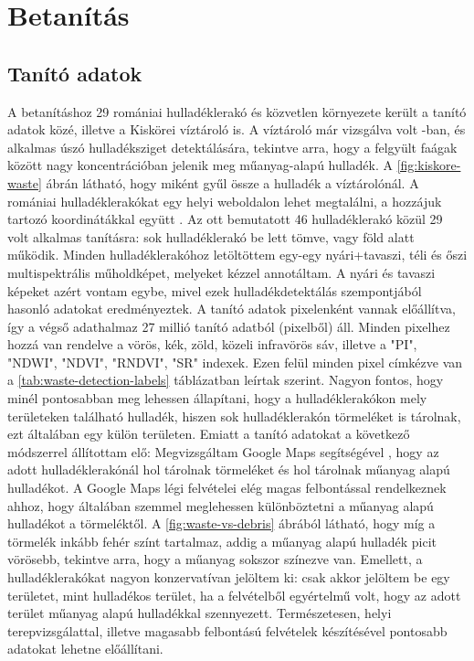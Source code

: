 \chapter{Betanítás}
\label{ch:training}

\section{Tanító adatok}

A betanításhoz 29 romániai hulladéklerakó és közvetlen környezete került a tanító adatok közé, illetve a Kiskörei víztároló is. A víztároló már vizsgálva volt \cite{magyar2023}-ban, és alkalmas úszó hulladéksziget detektálására, tekintve arra, hogy a felgyült faágak között nagy koncentrációban jelenik meg műanyag-alapú hulladék. A \ref{fig:kiskore-waste} ábrán látható, hogy miként gyűl össze a hulladék a víztárolónál. A romániai hulladéklerakókat egy helyi weboldalon lehet megtalálni, a hozzájuk tartozó koordinátákkal együtt \cite{wasteromania2019}. Az ott bemutatott 46 hulladéklerakó közül 29 volt alkalmas tanításra: sok hulladéklerakó be lett tömve, vagy föld alatt működik. Minden hulladéklerakóhoz letöltöttem egy-egy nyári+tavaszi, téli és őszi multispektrális műholdképet, melyeket kézzel annotáltam. A nyári és tavaszi képeket azért vontam egybe, mivel ezek hulladékdetektálás szempontjából hasonló adatokat eredményeztek. A tanító adatok pixelenként vannak előállítva, így a végső adathalmaz 27 millió tanító adatból (pixelből) áll. Minden pixelhez hozzá van rendelve a vörös, kék, zöld, közeli infravörös sáv, illetve a "PI", "NDWI", "NDVI", "RNDVI", "SR" indexek. Ezen felül minden pixel címkézve van a \ref{tab:waste-detection-labels} táblázatban leírtak szerint. Nagyon fontos, hogy minél pontosabban meg lehessen állapítani, hogy a hulladéklerakókon mely területeken található hulladék, hiszen sok hulladéklerakón törmeléket is tárolnak, ezt általában egy külön területen. Emiatt a tanító adatokat a következő módszerrel állítottam elő: Megvizsgáltam Google Maps segítségével \cite{googlemaps2024}, hogy az adott hulladéklerakónál hol tárolnak törmeléket és hol tárolnak műanyag alapú hulladékot. A Google Maps légi felvételei elég magas felbontással rendelkeznek ahhoz, hogy általában szemmel meglehessen különböztetni a műanyag alapú hulladékot a törmeléktől. A \ref{fig:waste-vs-debris} ábrából látható, hogy míg a törmelék inkább fehér színt tartalmaz, addig a műanyag alapú hulladék picit vörösebb, tekintve arra, hogy a műanyag sokszor színezve van. Emellett, a hulladéklerakókat nagyon konzervatívan jelöltem ki: csak akkor jelöltem be egy területet, mint hulladékos terület, ha a felvételből egyértelmű volt, hogy az adott terület műanyag alapú hulladékkal szennyezett. Természetesen, helyi terepvizsgálattal, illetve magasabb felbontású felvételek készítésével pontosabb adatokat lehetne előállítani. 

